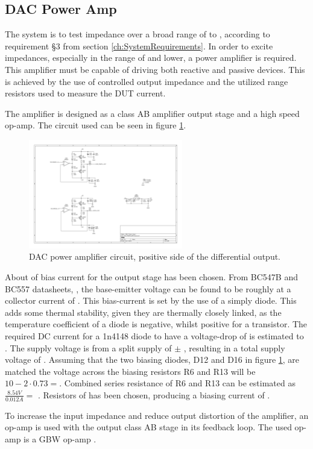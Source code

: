 \subsection{DAC Power Amp} \label{subsec:DAC_Filter}
The system is to test impedance over a broad range of  to , according to requirement §3 from section \ref{ch:SystemRequirements}. In order to excite impedances, especially in the range of  and lower, a power amplifier is required. This amplifier must be capable of driving both reactive and passive devices. This is achieved by the use of controlled output impedance and the utilized range resistors used to measure the DUT current. 

The amplifier is designed as a class AB amplifier output stage and a high speed op-amp. The circuit used can be seen in figure \ref{fig_7_1_1_5_DAC_POWER_AMP}.

\begin{figure}[H]
    \centering
    \includegraphics[clip, trim=0 100 0 100, width=0.6\textwidth]{Sections/7_SystemDesign/Figures/7_1_1_5_DAC Power Amp.pdf}
    \caption{DAC power amplifier circuit, positive side of the differential output.}
    \label{fig_7_1_1_5_DAC_POWER_AMP}
\end{figure}

About  of bias current for the output stage has been chosen. From BC547B and BC557 datasheets, \cite{BC547_datasheet} \cite{BC557_datasheet}, the base-emitter voltage can be found to be roughly  at a collector current of . This bias-current is set by the use of a simply diode. This adds some thermal stability, given they are thermally closely linked, as the temperature coefficient of a diode is negative, whilst positive for a transistor. The required DC current for a 1n4148 diode to have a voltage-drop of  is estimated to . The supply voltage is from a split supply of $\pm$ , resulting in a total supply voltage of . Assuming that the two biasing diodes, D12 and D16 in figure \ref{fig_7_1_1_5_DAC_POWER_AMP}, are matched the voltage across the biasing resistors R6 and R13 will be $10-2\cdot0.73 = $. Combined series resistance of R6 and R13 can be estimated as $\frac{8.54 V}{0.012 A} = $ . Resistors of  has been chosen, producing a biasing current of .

To increase the input impedance and reduce output distortion of the amplifier, an op-amp is used with the output class AB stage in its feedback loop. The used op-amp is a  GBW op-amp \cite{AD8032_datasheet}. 